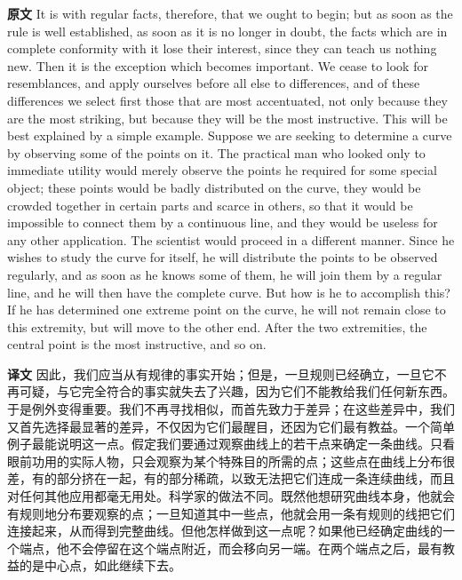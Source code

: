 \documentclass[UTF8]{ctexart}
\newenvironment{english}{\par\small\noindent\textbf{原文}\quad\ignorespaces}{\par}
\newenvironment{zhtranslation}{\par\noindent\textbf{译文}\quad\ignorespaces}{\par\vspace{0.35em}}
\begin{document}
\begin{english}
It is with regular facts, therefore, that we ought to begin; but as soon as the rule is well established, as soon as it is no longer in doubt, the facts which are in complete conformity with it lose their interest, since they can teach us nothing new. Then it is the exception which becomes important. We cease to look for resemblances, and apply ourselves before all else to differences, and of these differences we select first those that are most accentuated, not only because they are the most striking, but because they will be the most instructive. This will be best explained by a simple example. Suppose we are seeking to determine a curve by observing some of the points on it. The practical man who looked only to immediate utility would merely observe the points he required for some special object; these points would be badly distributed on the curve, they would be crowded together in certain parts and scarce in others, so that it would be impossible to connect them by a continuous line, and they would be useless for any other application. The scientist would proceed in a different manner. Since he wishes to study the curve for itself, he will distribute the points to be observed regularly, and as soon as he knows some of them, he will join them by a regular line, and he will then have the complete curve. But how is he to accomplish this? If he has determined one extreme point on the curve, he will not remain close to this extremity, but will move to the other end. After the two extremities, the central point is the most instructive, and so on.
\end{english}
\begin{zhtranslation}
因此，我们应当从有规律的事实开始；但是，一旦规则已经确立，一旦它不再可疑，与它完全符合的事实就失去了兴趣，因为它们不能教给我们任何新东西。于是例外变得重要。我们不再寻找相似，而首先致力于差异；在这些差异中，我们又首先选择最显著的差异，不仅因为它们最醒目，还因为它们最有教益。一个简单例子最能说明这一点。假定我们要通过观察曲线上的若干点来确定一条曲线。只看眼前功用的实际人物，只会观察为某个特殊目的所需的点；这些点在曲线上分布很差，有的部分挤在一起，有的部分稀疏，以致无法把它们连成一条连续曲线，而且对任何其他应用都毫无用处。科学家的做法不同。既然他想研究曲线本身，他就会有规则地分布要观察的点；一旦知道其中一些点，他就会用一条有规则的线把它们连接起来，从而得到完整曲线。但他怎样做到这一点呢？如果他已经确定曲线的一个端点，他不会停留在这个端点附近，而会移向另一端。在两个端点之后，最有教益的是中心点，如此继续下去。\end{zhtranslation}
\end{document}
